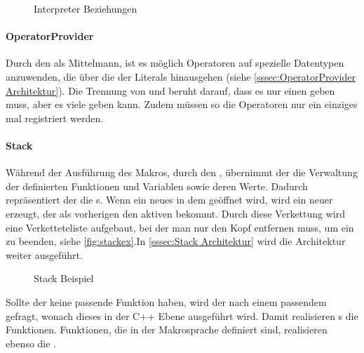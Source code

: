 {      \begin{figure}[H]
        \centering
        \caption{Interpreter Beziehungen}
        \label{fig:interpreterpackuml}
      \end{figure}

      \paragraph{OperatorProvider}
        Durch den  als Mittelmann, ist es möglich Operatoren auf spezielle Datentypen anzuwenden, die über die der Literals hinausgehen (siehe \autoref{sssec:OperatorProvider Architektur}). Die Trennung von  und  beruht darauf, dass es nur einen  geben muss, aber es viele  geben kann. Zudem müssen so die Operatoren nur ein einziges mal registriert werden.

      \paragraph{Stack}
        Während der Ausführung des Makros, durch den , übernimmt der  die Verwaltung der definierten Funktionen und Variablen sowie deren Werte. Dadurch repräsentiert der  die s. Wenn ein neues  in dem  geöffnet wird, wird ein neuer  erzeugt, der als vorherigen  den aktiven  bekommt. Durch diese Verkettung wird eine Verketteteliste aufgebaut, bei der man nur den Kopf entfernen muss, um ein  zu beenden, siehe \autoref{fig:stackex}.In \autoref{sssec:Stack Architektur} wird die Architektur weiter ausgeführt.
        \begin{figure}[H]
          \centering
          \caption{Stack Beispiel}
          \label{fig:stackex}
        \end{figure}

        Sollte der  keine passende Funktion haben, wird der  nach einem passendem  gefragt, wonach dieses in der C++ Ebene ausgeführt wird. Damit realisieren s die  Funktionen. Funktionen, die in der Makrosprache definiert sind, realisieren ebenso die .

}
